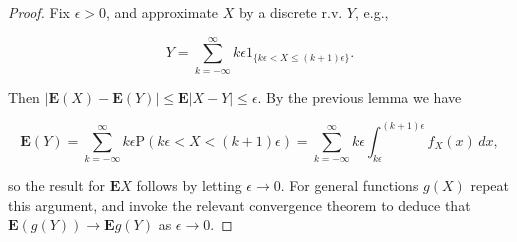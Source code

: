 \begin{proof}
Fix $\epsilon>0$, and approximate $X$ by a discrete
r.v. $Y$, e.g.,

\[
Y = \sum_{k=-\infty}^\infty k\epsilon 1_{\{k\epsilon < X \le (k+1)\epsilon\}}.
\]

\noindent Then
$|\mathbf{E}(X)-\mathbf{E}(Y)| \le \mathbf{E}|X-Y|
\le \epsilon$.
By the previous lemma we have

\[
\mathbf{E}(Y)  = \sum_{k=-\infty}^\infty k\epsilon \mathrm{P}(k\epsilon<X<(k+1)\epsilon) =\sum_{k=-\infty}^\infty k\epsilon \int_{k\epsilon}^{(k+1)\epsilon} f_X(x)\,dx,
\]

\noindent so the result for $\mathbf{E} X$ follows by letting
$\epsilon\to 0$. For general functions $g(X)$ repeat
this argument, and invoke the relevant convergence
theorem to deduce that
$\mathbf{E}(g(Y))\to \mathbf{E} g(Y)$ as
$\epsilon\to 0$.
\end{proof}
